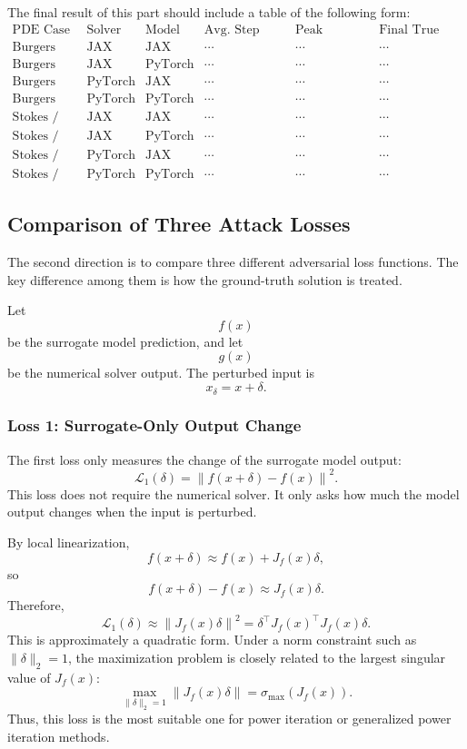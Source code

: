 \documentclass{article}
\begin{document}
The final result of this part should include a table of the following form:
\[
\begin{array}{c|c|c|c|c|c}
\text{PDE Case}
&
\text{Solver}
&
\text{Model}
&
\text{Avg. Step Time}
&
\text{Peak Memory}
&
\text{Final True Loss}
\\
\hline
\text{Burgers}
&
\text{JAX}
&
\text{JAX}
&
\cdots
&
\cdots
&
\cdots
\\
\text{Burgers}
&
\text{JAX}
&
\text{PyTorch}
&
\cdots
&
\cdots
&
\cdots
\\
\text{Burgers}
&
\text{PyTorch}
&
\text{JAX}
&
\cdots
&
\cdots
&
\cdots
\\
\text{Burgers}
&
\text{PyTorch}
&
\text{PyTorch}
&
\cdots
&
\cdots
&
\cdots
\\
\text{Stokes / NS}
&
\text{JAX}
&
\text{JAX}
&
\cdots
&
\cdots
&
\cdots
\\
\text{Stokes / NS}
&
\text{JAX}
&
\text{PyTorch}
&
\cdots
&
\cdots
&
\cdots
\\
\text{Stokes / NS}
&
\text{PyTorch}
&
\text{JAX}
&
\cdots
&
\cdots
&
\cdots
\\
\text{Stokes / NS}
&
\text{PyTorch}
&
\text{PyTorch}
&
\cdots
&
\cdots
&
\cdots
\end{array}
\]

\subsection{Comparison of Three Attack Losses}

The second direction is to compare three different adversarial loss functions. The key difference among them is how the ground-truth solution is treated.

Let
\[
f(x)
\]
be the surrogate model prediction, and let
\[
g(x)
\]
be the numerical solver output. The perturbed input is
\[
x_{\delta} = x+\delta.
\]

\subsubsection{Loss 1: Surrogate-Only Output Change}

The first loss only measures the change of the surrogate model output:
\[
\mathcal{L}_1(\delta)
=
\left\|
f(x+\delta)-f(x)
\right\|^2.
\]
This loss does not require the numerical solver. It only asks how much the model output changes when the input is perturbed.

By local linearization,
\[
f(x+\delta)
\approx
f(x) + J_f(x)\delta,
\]
so
\[
f(x+\delta)-f(x)
\approx
J_f(x)\delta.
\]
Therefore,
\[
\mathcal{L}_1(\delta)
\approx
\left\|
J_f(x)\delta
\right\|^2
=
\delta^\top J_f(x)^\top J_f(x)\delta.
\]
This is approximately a quadratic form. Under a norm constraint such as \(\|\delta\|_2=1\), the maximization problem is closely related to the largest singular value of \(J_f(x)\):
\[
\max_{\|\delta\|_2=1}
\left\|
J_f(x)\delta
\right\|
=
\sigma_{\max}(J_f(x)).
\]
Thus, this loss is the most suitable one for power iteration or generalized power iteration methods.
\end{document}
